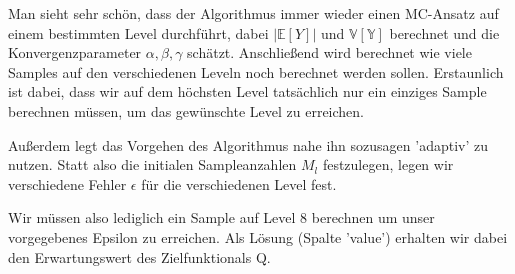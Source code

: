 Man sieht sehr schön, dass der Algorithmus immer wieder einen MC-Ansatz auf einem bestimmten Level durchführt, dabei $| \mathbb{E}[Y] |$ und $\mathbb{V[Y]}$ berechnet und die Konvergenzparameter $\alpha , \beta, \gamma$ schätzt. Anschließend wird berechnet wie viele Samples auf den verschiedenen Leveln noch berechnet werden sollen. 
Erstaunlich ist dabei, dass wir auf dem höchsten Level tatsächlich nur ein einziges Sample berechnen müssen, um das gewünschte Level zu erreichen.
\begin{figure}[H]
	\centering
\end{figure}
Außerdem legt das Vorgehen des Algorithmus nahe ihn sozusagen 'adaptiv' zu nutzen. Statt also die initialen Sampleanzahlen $M_l$ festzulegen, legen wir verschiedene Fehler $\epsilon$ für die verschiedenen Level fest.
\begin{figure}[H]
	\centering
\end{figure}
\begin{figure}[H]
	\centering
\end{figure}
Wir müssen also lediglich ein Sample auf Level 8 berechnen um unser vorgegebenes Epsilon zu erreichen.
Als Lösung (Spalte 'value') erhalten wir dabei den Erwartungswert des Zielfunktionals Q.

 





			
